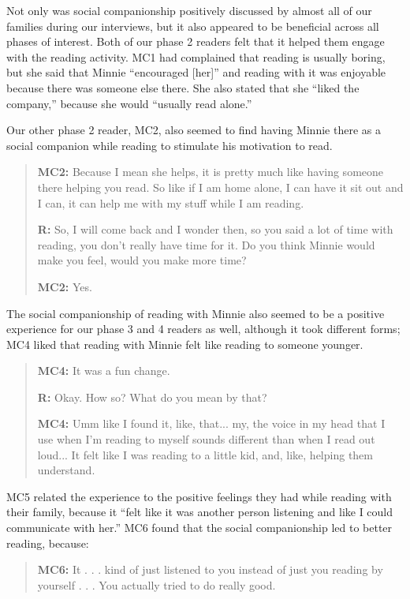 \documentclass{sigchi}
\begin{document}
Not only was social companionship positively discussed by almost all of our families during our interviews, but it also appeared to be beneficial across all phases of interest. Both of our phase 2 readers felt that it helped them engage with the reading activity. MC1 had complained that reading is usually boring, but she said that Minnie ``encouraged [her]'' and reading with it was enjoyable because there was someone else there. {\color{Purple}She also stated that she ``liked the company,'' because she would ``usually read alone.''}

Our other phase 2 reader, MC2, also seemed to find having Minnie there as a social companion while reading to stimulate his motivation to read.

	 \begin{quote}
		\textbf{MC2:} Because I mean she helps, it is pretty much like having someone there helping you read. So like if I am home alone, I can have it sit out and I can, it can help me with my stuff while I am reading. 
	
		\textbf{R:} So, I will come back and I wonder then, so you said a lot of time with reading, you don't really have time for it. Do you think Minnie would make you feel, would you make more time? 
		
		\textbf{MC2:} Yes. 
 	\end{quote}
 
The social companionship of reading with Minnie also seemed to be a positive experience for our phase 3 and 4 readers as well, although it took different forms; MC4 liked that reading with Minnie felt like reading to someone younger.
 
 \begin{quote}
 	 \textbf{MC4:} It was a fun change. 
 	 
 	 \textbf{R:} Okay. How so? What do you mean by that?
 	 
 	 \textbf{MC4:} Umm like I found it, like, that... my, the voice in my head that I use when I'm reading to myself sounds different than when I read out loud... It felt like I was reading to a little kid, and, like, helping them understand.
 	 \end{quote}
 	 
MC5 related the experience to the positive feelings they had while reading with their family, because it ``felt like it was another person listening and like I could communicate with her.'' MC6 found that the social companionship led to better reading, because:

	\begin{quote} 	
		 \textbf{MC6:} It . . . kind of just listened to you instead of just you reading by yourself . . . You actually tried to do really good.
	\end{quote}
 
\end{document}
